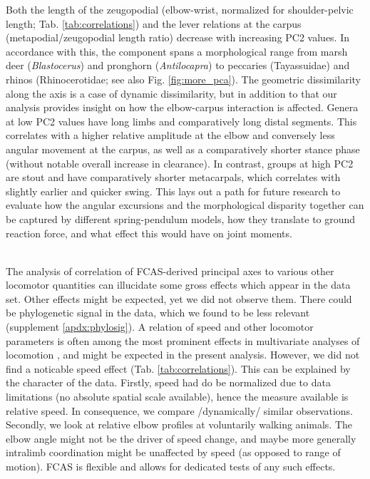 Both the length of the zeugopodial (elbow-wrist, normalized for shoulder-pelvic length; Tab. \ref{tab:correlations}) and the lever relations at the carpus (metapodial/zeugopodial length ratio) decrease with increasing PC2 values.
In accordance with this, the component spans a morphological range from marsh deer (\textit{Blastocerus}) and pronghorn (\textit{Antilocapra}) to peccaries (Tayassuidae) and rhinos (Rhinocerotidae; see also Fig. \ref*{fig:more_pca}).
The geometric dissimilarity along the axis is a case of dynamic dissimilarity, but in addition to that our analysis provides insight on how the elbow-carpus interaction is affected.
Genera at low PC2 values have long limbs and comparatively long distal segments.
This correlates with a higher relative amplitude at the elbow and conversely less angular movement at the carpus, as well as a comparatively shorter stance phase (without notable overall increase in clearance).
In contrast, groups at high PC2 are stout and have comparatively shorter metacarpals, which correlates with slightly earlier and quicker swing.
This lays out a path for future research to evaluate how the angular excursions and the morphological disparity together can be captured by different spring-pendulum models, how they translate to ground reaction force, and what effect this would have on joint moments.
\begin{change}
\\The analysis of correlation of FCAS-derived principal axes to various other locomotor quantities can illucidate some gross effects which appear in the data set.
Other effects might be expected, yet we did not observe them.
There could be phylogenetic signal in the data, which we found to be less relevant (supplement \ref*{apdx:phylosig}).
A relation of speed and other locomotor parameters is often among the most prominent effects in multivariate analyses of locomotion \citep{Druelle2021,Kirtley1985,Fukuchi2019,Schwartz2008}, and might be expected in the present analysis.
However, we did not find a noticable speed effect (Tab. \ref{tab:correlations}).
This can be explained by the character of the data.
Firstly, speed had do be normalized due to data limitations (no absolute spatial scale available), hence the measure available is relative speed.
In consequence, we compare /dynamically/ similar observations.
Secondly, we look at relative elbow profiles at voluntarily walking animals.
The elbow  angle might not be the driver of speed change, and maybe more generally intralimb coordination might be unaffected by speed (as opposed to range of motion).
FCAS is flexible and allows for dedicated tests of any such effects.
\end{change}




